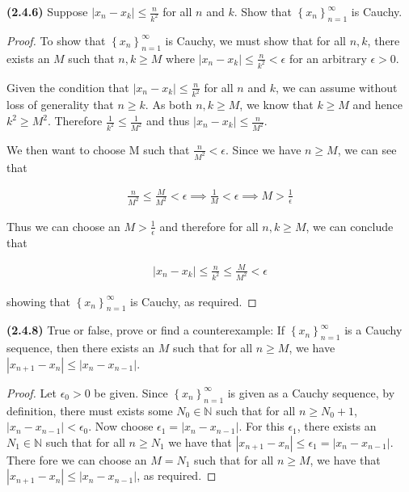 \documentclass[12pt]{article}
\newcommand{\abs}[1]{\left| {#1} \right|}
\newcommand{\seq}[2][n]{\left\{ {#2} \right\}_{#1=1}^\infty}
\newcommand{\bN}{\mathbb{N}}
\begin{document}
\newpage

\noindent \textbf{(2.4.6)} Suppose $\abs{x_n-x_k}\le\frac{n}{k^2}$ for all $n$ and $k$. Show that $\seq{x_n}$ is Cauchy.

\begin{proof}
	To show that $\seq{x_n}$ is Cauchy, we must show that for all $n,k$, there exists an $M$ such that $n,k\ge M$ where $\abs{x_n-x_k}\le\frac{n}{k^2}<\epsilon$ for an arbitrary $\epsilon>0$.
	
\indent Given the condition that $\abs{x_n-x_k}\le\frac{n}{k^2}$ for all $n$ and $k$, we can assume without loss of generality that $n\ge k$. As both $n,k\ge M$, we know that $k\ge M$ and hence $k^2\ge M^2$. Therefore $\frac{1}{k^2}\le\frac{1}{M^2}$ and thus $\abs{x_n-x_k}\le\frac{n}{M^2}$.

\indent We then want to choose M such that $\frac{n}{M^2}<\epsilon$. Since we have $n\ge M$, we can see that 

\begin{align*}
	\frac{n}{M^2}\le\frac{M}{M^2}<\epsilon \implies\frac{1}{M}<\epsilon\implies M>\frac{1}{\epsilon}
\end{align*}

Thus we can choose an $M>\frac{1}{\epsilon}$ and therefore for all $n,k\ge M$, we can conclude that

\begin{align*}
	\abs{x_n-x_k}\le\frac{n}{k^2}\le\frac{M}{M^2}<\epsilon
\end{align*}

\noindent showing that $\seq{x_n}$ is Cauchy, as required.
\end{proof}

\newpage

\noindent \textbf{(2.4.8)} True or false, prove or find a counterexample: If $\seq{x_n}$ is a Cauchy sequence, then there exists an $M$ such that for all $n\ge M$, we have $\abs{x_{n+1}-x_n}\le\abs{x_n-x_{n-1}}$.

\begin{proof}
	Let $\epsilon_0>0$ be given. Since $\seq{x_n}$ is given as a Cauchy sequence, by definition, there must exists some $N_0\in\bN$ such that for all $n\ge N_0 + 1$, $\abs{x_n-x_{n-1}}<\epsilon_0$. Now choose $\epsilon_1=\abs{x_n-x_{n-1}}$. For this $\epsilon_1$, there exists an $N_1\in\bN$ such that for all $n\ge N_1$ we have that $\abs{x_{n+1}-x_n}\le\epsilon_1=\abs{x_n-x_{n-1}}$. There fore we can choose an $M=N_1$ such that for all $n\ge M$, we have that $\abs{x_{n+1}-x_n}\le\abs{x_n-x_{n-1}}$, as required.  
\end{proof}
\end{document}
